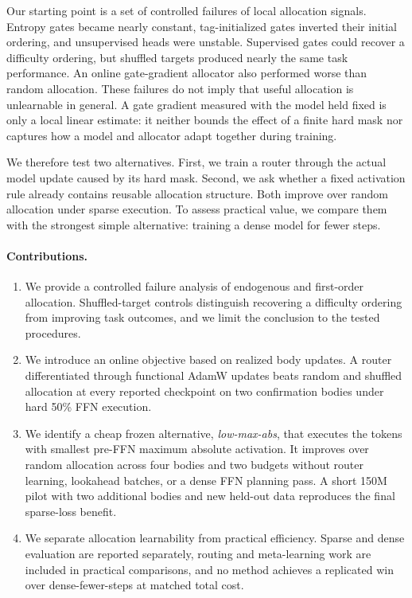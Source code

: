 \documentclass{article}
\begin{document}
Our starting point is a set of controlled failures of local allocation signals.
Entropy gates became nearly constant, tag-initialized gates inverted their
initial ordering, and unsupervised heads were unstable. Supervised gates could
recover a difficulty ordering, but shuffled targets produced nearly the same
task performance. An online gate-gradient allocator also performed worse than
random allocation. These failures do not imply that useful allocation is
unlearnable in general. A gate gradient measured with the model held fixed is
only a local linear estimate: it neither bounds the effect of a finite hard
mask nor captures how a model and allocator adapt together during training.

We therefore test two alternatives. First, we train a router through the actual
model update caused by its hard mask. Second, we ask whether a fixed activation
rule already contains reusable allocation structure. Both improve over random
allocation under sparse execution. To assess practical value, we compare them
with the strongest simple alternative: training a dense model for fewer steps.

\paragraph{Contributions.}
\begin{enumerate}
\item We provide a controlled failure analysis of endogenous and first-order
allocation. Shuffled-target controls distinguish recovering a difficulty
ordering from improving task outcomes, and we limit the conclusion to the
tested procedures.
\item We introduce an online objective based on realized body updates. A router
differentiated through functional AdamW updates beats random and shuffled
allocation at every reported checkpoint on two confirmation bodies under hard
50\% FFN execution.
\item We identify a cheap frozen alternative, \emph{low-max-abs}, that executes
the tokens with smallest pre-FFN maximum absolute activation. It improves over
random allocation across four bodies and two budgets without router learning,
lookahead batches, or a dense FFN planning pass. A short 150M pilot with two
additional bodies and new held-out data reproduces the final sparse-loss
benefit.
\item We separate allocation learnability from practical efficiency. Sparse and
dense evaluation are reported separately, routing and meta-learning work are
included in practical comparisons, and no method achieves a replicated win over
dense-fewer-steps at matched total cost.
\end{enumerate}
\end{document}
